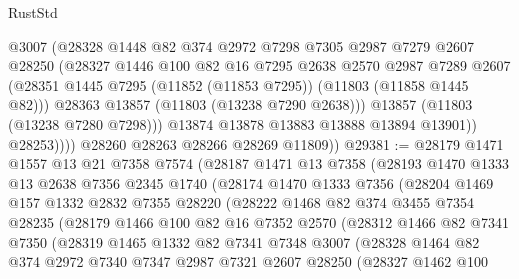 \begin{lexlean}{RustStd}
\begin{coremodule}
                    @3007
                    (@28328
                      @1448
                      @82
                      @374
                      @2972
                      @7298
                      @7305
                      @2987
                      @7279
                      @2607
                      @28250
                      (@28327
                        @1446
                        @100
                        @82
                        @16
                        @7295
                        @2638
                        @2570
                        @2987
                        @7289
                        @2607
                        (@28351 @1445 @7295 (@11852 (@11853 @7295)) (@11803 (@11858 @1445 @82)))
                        @28363
                        @13857
                        (@11803 (@13238 @7290 @2638)))
                      @13857
                      (@11803 (@13238 @7280 @7298)))
                    @13874
                    @13878
                    @13883
                    @13888
                    @13894
                    @13901))
                @28253))))
        @28260
        @28263
        @28266
        @28269
        @11809))
@29381 := @28179
    @1471
    @1557
    @13
    @21
    @7358
    @7574
    (@28187
      @1471
      @13
      @7358
      (@28193
        @1470
        @1333
        @13
        @2638
        @7356
        @2345
        @1740
        (@28174
          @1470
          @1333
          @7356
          (@28204
            @1469
            @157
            @1332
            @2832
            @7355
            @28220
            (@28222
              @1468
              @82
              @374
              @3455
              @7354
              @28235
              (@28179
                @1466
                @100
                @82
                @16
                @7352
                @2570
                (@28312
                  @1466
                  @82
                  @7341
                  @7350
                  (@28319
                    @1465
                    @1332
                    @82
                    @7341
                    @7348
                    @3007
                    (@28328
                      @1464
                      @82
                      @374
                      @2972
                      @7340
                      @7347
                      @2987
                      @7321
                      @2607
                      @28250
                      (@28327
                        @1462
                        @100

\end{coremodule}
\end{lexlean}
